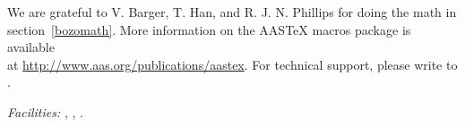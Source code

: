 \documentclass[manuscript]{aastex}
\begin{document}
\acknowledgments

We are grateful to V. Barger, T. Han, and R. J. N. Phillips for
doing the math in section~\ref{bozomath}.
More information on the AASTeX macros package is available \\ at
\url{http://www.aas.org/publications/aastex}.
For technical support, please write to
.



{\it Facilities:} , , .


\end{document}
